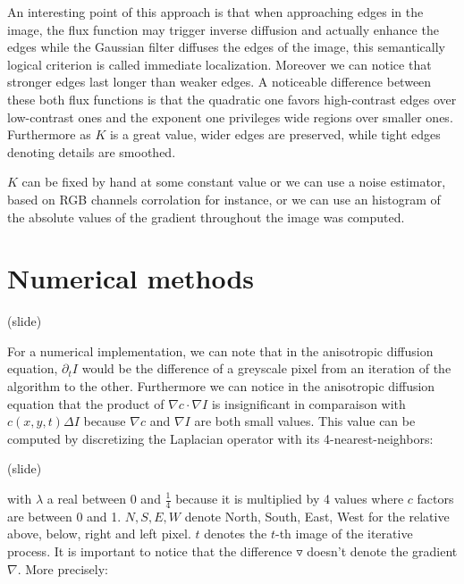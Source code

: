 \documentclass{article}
\begin{document}
An interesting point of this approach is that when approaching edges in the image, the flux function may trigger inverse diffusion and actually enhance the edges while the Gaussian filter diffuses the edges of the image, this semantically logical criterion is called immediate localization. Moreover we can notice that stronger edges last longer than weaker edges. A noticeable difference between these both flux functions is that the quadratic one favors high-contrast edges over low-contrast ones and the exponent one privileges wide regions over smaller ones. Furthermore as $K$ is a great value, wider edges are preserved, while tight edges denoting details are smoothed. %


$K$ can be fixed by hand at some constant value or we can use a noise estimator, based on RGB channels corrolation for instance, or we can use an histogram of the absolute values of the gradient throughout the image was computed. %

\section{Numerical methods}

(slide)

For a numerical implementation, we can note that in the anisotropic diffusion equation, $\partial_t I$ would be the difference of a greyscale pixel from an iteration of the algorithm to the other. Furthermore we can notice in the anisotropic diffusion equation that the product of $\nabla c \cdot \nabla I$ is insignificant in comparaison with $c(x,y,t)\Delta I$ because $\nabla c$ and $\nabla I$ are both small values. This value can be computed by discretizing the Laplacian operator with its 4-nearest-neighbors:

(slide)


with $\lambda$ a real between 0 and $\frac{1}{4}$ because it is multiplied by 4 values where $c$ factors are between 0 and 1. $N, S, E, W$ denote North, South, East, West for the relative above, below, right and left pixel. $t$ denotes the $t$-th image of the iterative process. It is important to notice that the difference $\triangledown$ doesn't denote the gradient $\nabla$. More precisely:
\end{document}
